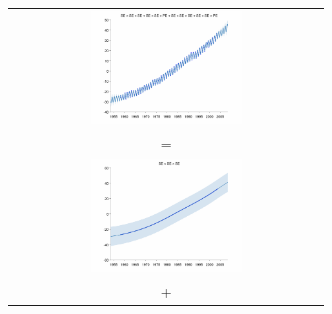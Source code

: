 \documentclass[twoside]{article}
\begin{document}
\begin{figure}[h!]
\newcommand{\wmgd}{8cm}  %
\newcommand{\hmgd}{3cm}  %
\begin{tabular}{c}
 \includegraphics[width=\wmgd,height=\hmgd]{../figures/decomposition/03-mauna2003_max_level_8/03-mauna2003_all} \\ = \\
 \includegraphics[width=\wmgd,height=\hmgd]{../figures/decomposition/03-mauna2003_max_level_8/03-mauna2003_3} \\ + \\

\end{tabular}
\end{figure}
\end{document}
